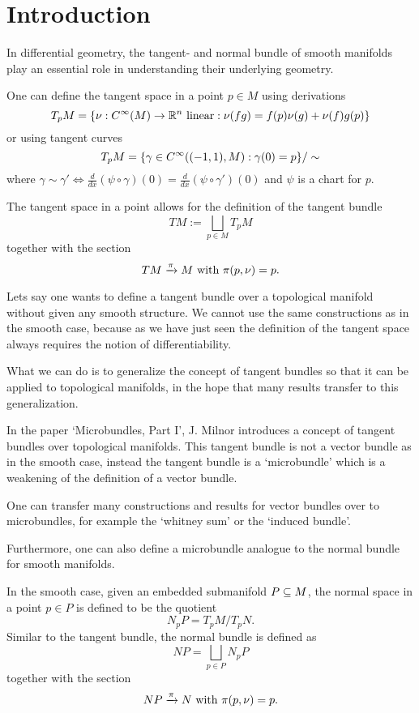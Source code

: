 \chapter{Introduction}\label{chapter::introduction}

\begin{myparagraph}
    In differential geometry,
    the tangent- and normal bundle of smooth manifolds
    play an essential role in understanding their underlying geometry.

    One can define the tangent space
    in a point $p \in M$ using derivations
    \[ T_p M = \{\nu: C^\infty(M) \to \mathbb{R}^n \text{ linear}:\nu(fg) = f(p)\nu(g) + \nu(f)g(p)\} \]    
    or using tangent curves
    \[ T_p M = \{\gamma \in C^\infty((-1, 1), M):\gamma(0) = p \} / \sim \]
    where $\gamma \sim \gamma' \iff \frac{d}{dx}(\psi \circ \gamma)(0) = \frac{d}{dx}(\psi \circ \gamma')(0)$
    and $\psi$ is a chart for $p$.
    
    The tangent space in a point allows for the definition of the tangent bundle
    \[ TM := \bigsqcup_{p \in M} T_p M\]
    together with the section
    \[ TM \xrightarrow{\pi} M \text{ with } \pi(p, \nu) = p. \]

    Lets say one wants to define a tangent bundle over a topological manifold
    without given any smooth structure.
    We cannot use the same constructions as in the smooth case, because
    as we have just seen the definition of
    the tangent space always requires the notion of differentiability.

    What we can do is to generalize the concept of tangent bundles
    so that it can be applied to topological manifolds,
    in the hope that many results transfer to this generalization.

    In the paper `Microbundles, Part I', J. Milnor introduces a concept
    of tangent bundles over topological manifolds.
    This tangent bundle is not a vector bundle as in the smooth case,
    instead the tangent bundle is a `microbundle'
    which is a weakening of the definition of a vector bundle.

    One can transfer many constructions and results for
    vector bundles over to microbundles,
    for example the `whitney sum' or the `induced bundle'. 

    Furthermore, one can also define a microbundle analogue
    to the normal bundle for smooth manifolds.

    In the smooth case, given an embedded submanifold $P \subseteq{} M$,
    the normal space in a point $p \in P$
    is defined to be the quotient
    \[ N_p P = T_p M / T_p N. \]
    Similar to the tangent bundle, the normal bundle is defined as
    \[ NP  = \bigsqcup_{p \in P} N_p P \]
    together with the section
    \[ NP \xrightarrow{\pi} N \text{ with } \pi(p, \nu) = p. \]
    

\end{myparagraph}

